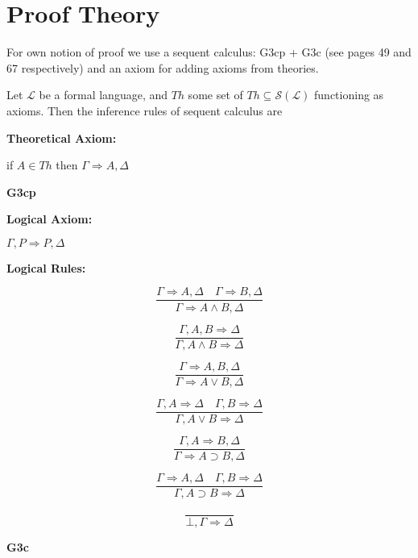 	\chapter{Proof Theory}\label{chapter:proof-theory}
For own notion of proof we use a sequent calculus: G3cp + G3c (see \cite{negri:2001} pages 49 and 67 respectively) and an axiom for adding axioms from theories.
\begin{definition}\label{def:Seq-Calc}
  \leanok
    Let $\mathcal{L}$ be a formal language, and $Th$ some set of $Th \subseteq \mathcal{S}(\mathcal{L})$ functioning as axioms. Then the inference rules of sequent calculus are

\noindent \textbf{Theoretical Axiom:}

if $A \in Th$ then $\Gamma \Rightarrow A, \Delta$

\begin{center}
    \textbf{G3cp}
\end{center}
\noindent \textbf{Logical Axiom:}

$\Gamma, P \Rightarrow P, \Delta$

\noindent \textbf{Logical Rules:}
\begin{multicols}{2}
\[
\frac{\Gamma \Rightarrow A, \Delta \quad \Gamma \Rightarrow B, \Delta}{\Gamma \Rightarrow A \land B, \Delta}\tag{$R\land$}
\]

\[
\frac{\Gamma, A, B \Rightarrow \Delta}{\Gamma, A \land B \Rightarrow \Delta}\tag{$L\land$}
\]

\[
\frac{\Gamma \Rightarrow A, B, \Delta}{\Gamma \Rightarrow A \lor B, \Delta}\tag{$R\lor$}
\]

\[
\frac{\Gamma, A \Rightarrow \Delta \quad \Gamma, B \Rightarrow \Delta}{\Gamma, A \lor B \Rightarrow \Delta}\tag{$L\lor$}
\]

\[
\frac{\Gamma, A \Rightarrow B, \Delta}{\Gamma \Rightarrow A \supset B, \Delta}\tag{$R\supset$}
\]

\[
\frac{\Gamma \Rightarrow A, \Delta \quad \Gamma, B \Rightarrow \Delta}{\Gamma, A \supset B \Rightarrow \Delta}\tag{$L\supset$}
\]

\[
\frac{}{\bot, \Gamma \Rightarrow \Delta}\tag{$L\bot$}
\]

\end{multicols}

\begin{center}
    \textbf{G3c}
\end{center}
\begin{multicols}{2}


\end{multicols}
\end{definition}
